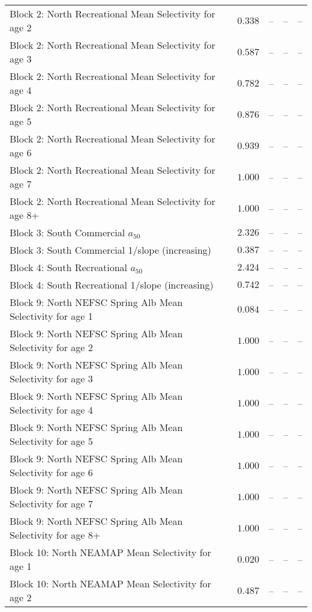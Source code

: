 \documentclass[
]{article}
\begin{document}
\begin{landscape}
\begin{longtable}[t]{lrrrr}
\addlinespace
Block 2: North Recreational Mean Selectivity for age 2 & $0.338$ & -- & -- & --\\
Block 2: North Recreational Mean Selectivity for age 3 & $0.587$ & -- & -- & --\\
Block 2: North Recreational Mean Selectivity for age 4 & $0.782$ & -- & -- & --\\
Block 2: North Recreational Mean Selectivity for age 5 & $0.876$ & -- & -- & --\\
Block 2: North Recreational Mean Selectivity for age 6 & $0.939$ & -- & -- & --\\
\addlinespace
Block 2: North Recreational Mean Selectivity for age 7 & $1.000$ & -- & -- & --\\
Block 2: North Recreational Mean Selectivity for age 8+ & $1.000$ & -- & -- & --\\
Block 3: South Commercial $a_{50}$ & $2.326$ & -- & -- & --\\
Block 3: South Commercial 1/slope (increasing) & $0.387$ & -- & -- & --\\
Block 4: South Recreational $a_{50}$ & $2.424$ & -- & -- & --\\
\addlinespace
Block 4: South Recreational 1/slope (increasing) & $0.742$ & -- & -- & --\\
Block 9: North NEFSC Spring Alb Mean Selectivity for age 1 & $0.084$ & -- & -- & --\\
Block 9: North NEFSC Spring Alb Mean Selectivity for age 2 & $1.000$ & -- & -- & --\\
Block 9: North NEFSC Spring Alb Mean Selectivity for age 3 & $1.000$ & -- & -- & --\\
Block 9: North NEFSC Spring Alb Mean Selectivity for age 4 & $1.000$ & -- & -- & --\\
\addlinespace
Block 9: North NEFSC Spring Alb Mean Selectivity for age 5 & $1.000$ & -- & -- & --\\
Block 9: North NEFSC Spring Alb Mean Selectivity for age 6 & $1.000$ & -- & -- & --\\
Block 9: North NEFSC Spring Alb Mean Selectivity for age 7 & $1.000$ & -- & -- & --\\
Block 9: North NEFSC Spring Alb Mean Selectivity for age 8+ & $1.000$ & -- & -- & --\\
Block 10: North NEAMAP Mean Selectivity for age 1 & $0.020$ & -- & -- & --\\
\addlinespace
Block 10: North NEAMAP Mean Selectivity for age 2 & $0.487$ & -- & -- & --\\

\end{longtable}
\end{landscape}
\end{document}
